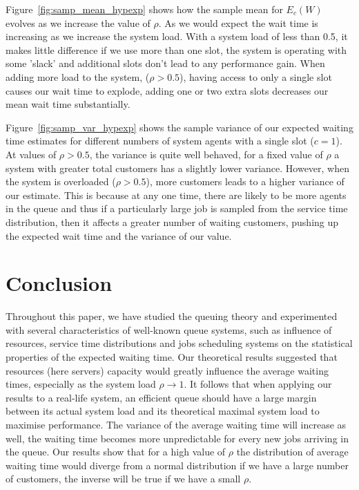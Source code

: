 \documentclass{article}
\begin{document}
    Figure~\ref{fig:samp_mean_hypexp} shows how the sample mean for $E_c(W)$ evolves as we increase the value of $\rho$. As we would expect the wait time is increasing as we increase the system load. With a system load of less than 0.5, it makes little difference if we use more than one slot, the system is operating with some 'slack' and additional slots don't lead to any performance gain. When adding more load to the system, ($\rho > 0.5$), having access to only a single slot causes our wait time to explode, adding one or two extra slots decreases our mean wait time substantially.

    Figure~\ref{fig:samp_var_hypexp} shows the sample variance of our expected waiting time estimates for different numbers of system agents with a single slot ($c = 1$). At values of $\rho > 0.5$, the variance is quite well behaved, for a fixed value of $\rho$ a system with greater total customers has a slightly lower variance. However, when the system is overloaded ($\rho > 0.5$), more customers leads to a higher variance of our estimate. This is because at any one time, there are likely to be more agents in the queue and thus if a particularly large job is sampled from the service time distribution, then it affects a greater number of waiting customers, pushing up the expected wait time and the variance of our value.

    \section*{Conclusion}
    Throughout this paper, we have studied the queuing theory and experimented with several characteristics of well-known queue systems, such as influence of resources, service time distributions and jobs scheduling systems on the statistical properties of the expected waiting time. Our theoretical results suggested that resources (here servers) capacity would greatly influence the average waiting times, especially as the system load $\rho \rightarrow{1}$. It follows that when applying our results to a real-life system, an efficient queue should have a large margin between its actual system load and its theoretical maximal system load to maximise performance. The variance of the average waiting time will increase as well, the waiting time becomes more unpredictable for every new jobs arriving in the queue. Our results show that for a high value of $\rho$ the distribution of average waiting time would diverge from a normal distribution if we have a large number of customers, the inverse will be true if we have a small $\rho$.
\end{document}
